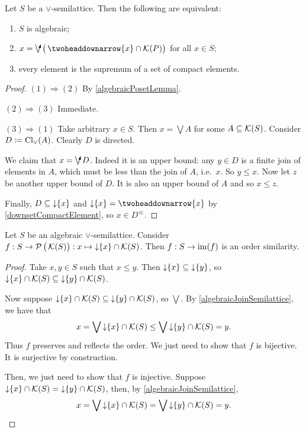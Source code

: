 \begin{proposition} \label{algebraicJoinSemilattice}
Let $S$ be a $\vee$-semilattice. Then the following are equivalent:
\begin{enumerate}
\item $S$ is algebraic;
\item $x = \dirvee\big(\ddownset \{x\}\cap \compacts(P)\big)$ for all $x\in S$;
\item every element is the supremum of a set of compact elements.
\end{enumerate}
\end{proposition}
\begin{proof}
$(1) \Rightarrow (2)$ By \ref{algebraicPosetLemma}.

$(2) \Rightarrow (3)$ Immediate.

$(3) \Rightarrow (1)$ Take arbitrary $x\in S$. Then $x = \bigvee A$ for some $A\subseteq \operatorname{\mathcal{K}}(S)$. Consider $D\coloneqq \operatorname{Cl}_\vee(A)$. Clearly $D$ is directed.

We claim that $x = \dirvee D$. Indeed it is an upper bound: any $y\in D$ is a finite join of elements in $A$, which must be less than the join of $A$, i.e.\ $x$. So $y\leq x$. Now let $z$ be another upper bound of $D$. It is also an upper bound of $A$ and so $x\leq z$.

Finally, $D\subseteq \operatorname{\downarrow}\{x\}$ and $\downset\{x\} = \ddownset\{x\}$ by \ref{downsetCompactElement}, so $x\in D^\ll$.
\end{proof}

\begin{lemma} \label{AlgebraicSemilatticeSetSimilarity}
Let $S$ be an algebraic $\vee$-semilattice. Consider $f: S\to \operatorname{\mathcal{P}}\big(\operatorname{\mathcal{K}}(S)\big): x \mapsto \operatorname{\downarrow}\{x\}\cap \operatorname{\mathcal{K}}(S)$. Then $f: S\to\operatorname{im}(f)$ is an order similarity.
\end{lemma}
\begin{proof}
Take $x,y\in S$ such that $x\leq y$. Then $\operatorname{\downarrow}\{x\}\subseteq \operatorname{\downarrow} \{y\}$, so $\operatorname{\downarrow}\{x\}\cap\operatorname{\mathcal{K}}(S)\subseteq \operatorname{\downarrow} \{y\}\cap \operatorname{\mathcal{K}}(S)$.

Now suppose $\operatorname{\downarrow}\{x\}\cap\operatorname{\mathcal{K}}(S)\subseteq \operatorname{\downarrow} \{y\}\cap \operatorname{\mathcal{K}}(S)$, so $\bigvee $. By \ref{algebraicJoinSemilattice}, we have that
\[ x = \bigvee \operatorname{\downarrow} \{x\}\cap \operatorname{\mathcal{K}}(S) \leq \bigvee \operatorname{\downarrow} \{y\}\cap \operatorname{\mathcal{K}}(S) = y. \]
Thus $f$ preserves and reflects the order. We just need to show that $f$ is bijective. It is surjective by construction.

Then, we just need to show that $f$ is injective. Suppose $\operatorname{\downarrow} \{x\}\cap \operatorname{\mathcal{K}}(S) = \operatorname{\downarrow} \{y\}\cap \operatorname{\mathcal{K}}(S)$, then, by \ref{algebraicJoinSemilattice},
\[ x = \bigvee \operatorname{\downarrow} \{x\}\cap \operatorname{\mathcal{K}}(S) = \bigvee \operatorname{\downarrow} \{y\}\cap \operatorname{\mathcal{K}}(S) = y. \]
\end{proof}

